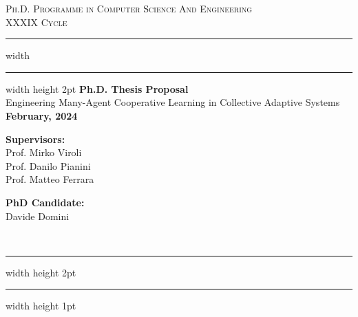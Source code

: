 \documentclass[12pt]{article}
\begin{document}
\begin{titlepage}

	\newcommand{\HRule}{\rule{\linewidth}{0.5mm}}
	\center
	
	\textsc{\Large Ph.D. Programme in Computer Science And Engineering}\\[0.5cm]
	
	\textsc{\Large XXXIX Cycle}\\[0.6cm]
	
	\hrule width \hsize \kern 1mm \hrule width \hsize height 2pt 
	\vspace{0.8cm}
	{ \large \bfseries Ph.D. Thesis Proposal}\\[0.6cm]
	{ \large Engineering Many-Agent Cooperative Learning in Collective Adaptive Systems }\\[0.6cm]





	\bfseries{February, 2024}


    \vspace{1.5cm}
    
    \noindent
    \begin{minipage}[t]{0.45\textwidth}
        \raggedright
        \textbf{Supervisors:}\\[0.5cm]
        Prof. Mirko Viroli\\
        Prof. Danilo Pianini\\
        Prof. Matteo Ferrara
    \end{minipage}%
    \hfill
    \begin{minipage}[t]{0.45\textwidth}
        \raggedleft
        \textbf{PhD Candidate:}\\[0.5cm]
        Davide Domini
    \end{minipage} \\[0.6cm]
	

	\hrule width \hsize height 2pt \kern 1mm \hrule width \hsize height 1pt
	\vspace{0.4cm}
	
\end{titlepage}
\end{document}
